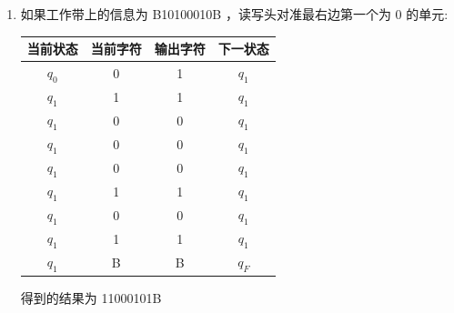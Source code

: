 \documentclass[../../main.tex]{subfiles}
\begin{document}
\begin{solution}
    \begin{enumerate}
        \item 如果工作带上的信息为 B10100010B ，读写头对准最右边第一个为 0 的单元:

              \begin{longtable}{cccc}
                  \hline
                  \textbf{当前状态} & \textbf{当前字符} & \textbf{输出字符} & \textbf{下一状态} \\
                  \hline
                  \(q_0\)       & 0             & 1             & \(q_1\)       \\
                  \(q_1\)       & 1             & 1             & \(q_1\)       \\
                  \(q_1\)       & 0             & 0             & \(q_1\)       \\
                  \(q_1\)       & 0             & 0             & \(q_1\)       \\
                  \(q_1\)       & 0             & 0             & \(q_1\)       \\
                  \(q_1\)       & 1             & 1             & \(q_1\)       \\
                  \(q_1\)       & 0             & 0             & \(q_1\)       \\
                  \(q_1\)       & 1             & 1             & \(q_1\)       \\
                  \(q_1\)       & B             & B             & \(q_F\)       \\
              \end{longtable}
              得到的结果为 11000101B


\end{enumerate}
\end{solution}
\end{document}

